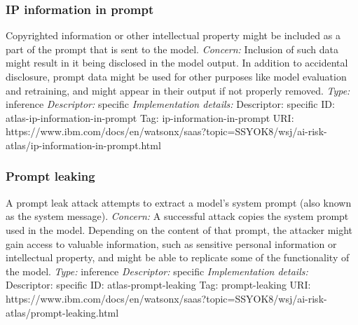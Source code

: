 \documentclass{article}
\begin{document}
\subsubsection*{IP information in prompt}
Copyrighted information or other intellectual property might be included as a part of the prompt that is sent to the model.\newline
\textit{Concern: }Inclusion of such data might result in it being disclosed in the model output. In addition to accidental disclosure, prompt data might be used for other purposes like model evaluation and retraining, and might appear in their output if not properly removed.\newline\newline
\textit{Type: }inference\newline
\textit{Descriptor: }specific \newline\newline
\textit{Implementation details:} \newline
Descriptor: specific \newline
ID: atlas-ip-information-in-prompt \newline
Tag: ip-information-in-prompt \newline
URI:  https://www.ibm.com/docs/en/watsonx/saas?topic=SSYOK8/wsj/ai-risk-atlas/ip-information-in-prompt.html\newline
\subsubsection*{Prompt leaking}
A prompt leak attack attempts to extract a model's system prompt (also known as the system message).\newline
\textit{Concern: }A successful attack copies the system prompt used in the model. Depending on the content of that prompt, the attacker might gain access to valuable information, such as sensitive personal information or intellectual property, and might be able to replicate some of the functionality of the model.\newline\newline
\textit{Type: }inference\newline
\textit{Descriptor: }specific \newline\newline
\textit{Implementation details:} \newline
Descriptor: specific \newline
ID: atlas-prompt-leaking \newline
Tag: prompt-leaking \newline
URI:  https://www.ibm.com/docs/en/watsonx/saas?topic=SSYOK8/wsj/ai-risk-atlas/prompt-leaking.html\newline
\end{document}

